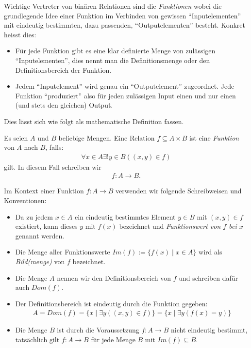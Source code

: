 Wichtige Vertreter von binären Relationen sind die \textit{Funktionen} wobei die grundlegende Idee einer Funktion im Verbinden von gewissen ``Inputelementen'' mit eindeutig bestimmten, dazu passenden, ``Outputelementen'' besteht. Konkret heisst dies:


\begin{itemize}
    \item Für jede Funktion gibt es eine klar definierte Menge von zulässigen ``Inputelementen'', dies nennt man die Definitionsmenge oder den Definitionsbereich der Funktion.
    \item Jedem ``Inputelement'' wird genau ein ``Outputelement'' zugeordnet. Jede Funktion ``produziert'' also für jeden zulässigen Input einen und nur einen (und stets den gleichen) Output.
\end{itemize}
Dies lässt sich wie folgt als mathematische Definition fassen.
\begin{df}
    Es seien $A$ und $B$ beliebige Mengen. Eine Relation $f\subseteq A\times B$ ist eine \textit{Funktion} von $A$ nach $B$, falls:
    \begin{align*}
    \forall x\in A\exists!y\in B((x,y)\in f)
    \end{align*}
    gilt. In diesem Fall schreiben wir
    \begin{align*}
    f:A\to B.
    \end{align*}
\end{df}

\begin{rk}
    Im Kontext einer Funktion $f:A\to B$ verwenden wir folgende Schreibweisen und Konventionen:
    \begin{itemize}
        \item Da zu jedem $x\in A$ ein eindeutig bestimmtes Element $y\in B$ mit $(x,y)\in f$ existiert, kann dieses $y$ mit $f(x)$ bezeichnet und \textit{Funktionswert von $f$ bei $x$} genannt werden.
        \item Die Menge aller Funktionswerte $Im(f) := \{f(x)\mid x\in A \}$ wird als \textit{Bild(menge)} von $f$ bezeichnet.
        \item Die Menge $A$ nennen wir den Definitionsbereich von $f$ und schreiben dafür auch $Dom(f)$.
        \item Der Definitionsbereich ist eindeutig durch die Funktion gegeben:
        \begin{align*}
            A=Dom(f)=\{x\mid \exists y ((x,y)\in f) \}=\{x\mid \exists y (f(x)=y )\}
        \end{align*}
        \item Die Menge $B$ ist durch die Voraussetzung $f:A\to B$ nicht eindeutig bestimmt, tatsächlich gilt $f:A\to B$ für jede Menge $B$ mit $Im(f)\subseteq B$.
    \end{itemize}
\end{rk}

